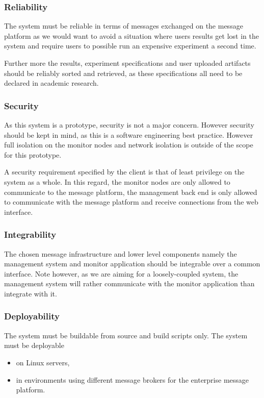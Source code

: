 \subsubsection*{Reliability}
The system must be reliable in terms of messages exchanged on the message platform
as we would want to avoid a situation where users results get lost in the
system and require users to possible run an expensive experiment a second
time.

Further more the results, experiment specifications and user uploaded artifacts
should be reliably sorted and retrieved, as these specifications all need to be
declared in academic research.

\subsubsection*{Security}
\label{sec:securityQualityRequirement}
As this system is a prototype, security is not a major concern. However security
should be kept in mind, as this is a software engineering best practice. However
full isolation on the monitor nodes and network isolation is outside of the scope
for this prototype.

A security requirement specified by the client is that of least privilege on 
the system as a whole. In this regard, the monitor nodes are only allowed to
communicate to the message platform, the management back end is only allowed to
communicate with the message platform and receive connections from the web interface.

\subsubsection*{Integrability}
The chosen message infrastructure and lower level components namely the
management system and monitor application should be integrable over a common
interface. Note however, as we are aiming for a loosely-coupled system, the 
management system will rather communicate with the monitor application than
integrate with it.

\subsubsection*{Deployability}
The system must be buildable from source and build scripts only.
The system must be deployable
\begin{itemize}
	\item on Linux servers,
	\item in environments using different message brokers for the
	enterprise message platform.
\end{itemize}

